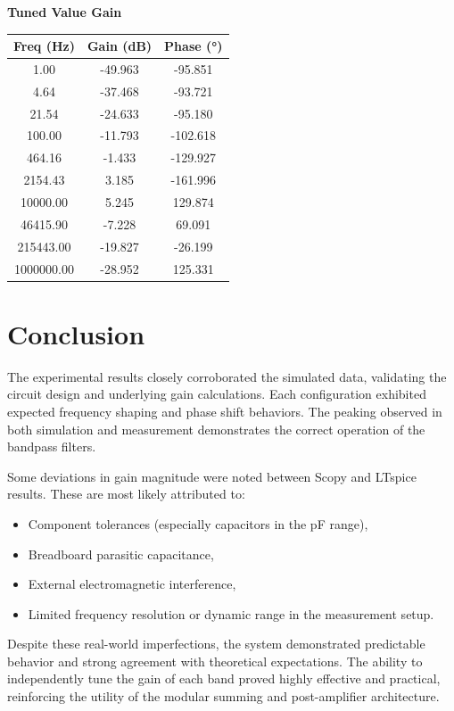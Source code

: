 \documentclass[12pt]{article}
\begin{document}
\noindent\textbf{Tuned Value Gain}
\begin{center}
	\begin{tabular}{|c|c|c|}
		\hline
		\textbf{Freq (Hz)} & \textbf{Gain (dB)} & \textbf{Phase (°)} \\
		\hline
		1.00               & -49.963            & -95.851            \\
		4.64               & -37.468            & -93.721            \\
		21.54              & -24.633            & -95.180            \\
		100.00             & -11.793            & -102.618           \\
		464.16             & -1.433             & -129.927           \\
		2154.43            & 3.185              & -161.996           \\
		10000.00           & 5.245              & 129.874            \\
		46415.90           & -7.228             & 69.091             \\
		215443.00          & -19.827            & -26.199            \\
		1000000.00         & -28.952            & 125.331            \\
		\hline
	\end{tabular}
\end{center}
\section{Conclusion}

The experimental results closely corroborated the simulated data, validating the circuit design and underlying gain calculations. Each configuration exhibited expected frequency shaping and phase shift behaviors. The peaking observed in both simulation and measurement demonstrates the correct operation of the bandpass filters.

Some deviations in gain magnitude were noted between Scopy and LTspice results. These are most likely attributed to:
\begin{itemize}
	\item Component tolerances (especially capacitors in the pF range),
	\item Breadboard parasitic capacitance,
	\item External electromagnetic interference,
	\item Limited frequency resolution or dynamic range in the measurement setup.
\end{itemize}

Despite these real-world imperfections, the system demonstrated predictable behavior and strong agreement with theoretical expectations. The ability to independently tune the gain of each band proved highly effective and practical, reinforcing the utility of the modular summing and post-amplifier architecture.
\end{document}
